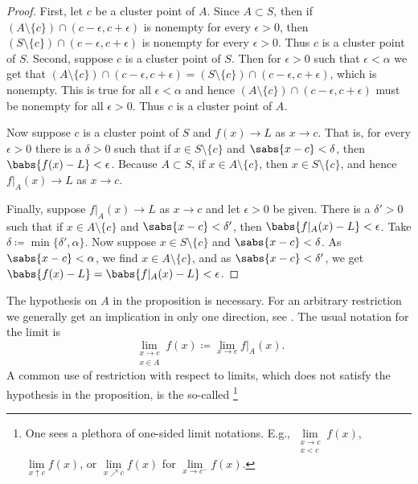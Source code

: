 \begin{proof}
First, let $c$ be a cluster point of $A$.
Since $A \subset S$, then if $( A \setminus \{ c\} ) \cap
(c-\epsilon,c+\epsilon)$ is nonempty for every $\epsilon > 0$,
then $( S \setminus \{ c\} ) \cap
(c-\epsilon,c+\epsilon)$ is nonempty for every $\epsilon > 0$.
Thus $c$ is a cluster point of $S$.
Second, suppose $c$ is a cluster
point of $S$.  Then for $\epsilon > 0$ such that $\epsilon < \alpha$
we get that $( A \setminus \{ c\} ) \cap (c-\epsilon,c+\epsilon) =
( S \setminus \{ c\} ) \cap (c-\epsilon,c+\epsilon)$, which is nonempty.  This is true for all
$\epsilon < \alpha$ and hence 
$( A \setminus \{ c\} ) \cap (c-\epsilon,c+\epsilon)$ must be nonempty for all
$\epsilon > 0$.  Thus $c$ is a cluster point of $A$.

Now suppose $c$ is a cluster point of $S$ and $f(x) \to L$ as $x \to c$.  That is, for every $\epsilon > 0$
there is a $\delta > 0$ such that if $x \in S \setminus \{ c \}$
and $\sabs{x-c} < \delta$, then $\babs{f(x)-L} < \epsilon$.  Because $A \subset S$,
if $x \in A \setminus \{ c \}$, then $x \in S \setminus \{ c \}$,
and hence $f|_A(x) \to L$ as $x \to c$.

Finally, suppose $f|_A(x) \to L$ as $x \to c$ and let $\epsilon > 0$ be
given.
There is a $\delta' > 0$ such that if $x \in A \setminus \{ c \}$
and $\sabs{x-c} < \delta'$, then $\babs{ f|_A(x)-L } < \epsilon$.
Take $\delta \coloneqq \min \{ \delta', \alpha \}$.
Now suppose $x \in S \setminus \{ c \}$ and
$\sabs{x-c} < \delta$.  As $\sabs{x-c} < \alpha$, we find $x \in A \setminus \{ c \}$,
and as $\sabs{x-c} < \delta'$, 
we get $\babs{f(x)-L} = \babs{ f|_A(x)-L } < \epsilon$.
\end{proof}

The hypothesis on $A$ in the proposition is necessary.  For an arbitrary
restriction we generally get an implication in only one direction,
see .  
The usual notation for the limit is
\begin{equation*}
\lim_{\substack{x \to c\\x \in A}} f(x) \coloneqq \lim_{x \to c} f|_A(x) .
\end{equation*}
A common use of restriction with respect to limits, which does not satisfy
the hypothesis in the proposition, is the so-called
\emph{}%
\footnote{%
One sees a plethora of one-sided limit notations.
E.g.,
$\lim\limits_{\substack{x \to c\\x < c}} f(x)$,
$\lim\limits_{x \uparrow c} f(x)$, or
$\lim\limits_{x \nearrow c} f(x)$ for
$\lim\limits_{x \to c^-} f(x)$.}

